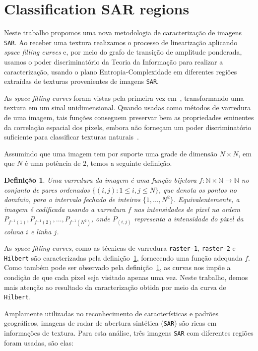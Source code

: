 \documentclass[12pt]{article}
\begin{document}
\section{Classification SAR regions}\label{SAR}

Neste trabalho propomos uma nova metodologia de caracterização de imagens \texttt{SAR}. 
Ao receber uma textura realizamos o processo de linearização aplicando \textit{space filling curves} e, por meio do grafo de transição de amplitude ponderada, usamos o poder discriminatório da Teoria da Informação para realizar a caracterização, usando o plano Entropia-Complexidade em diferentes regiões extraídas de texturas provenientes de imagens \texttt{SAR}.

As \textit{space filling curves} foram vistas pela primeira vez em~\cite{Nguyen1982SpaceFC}, transformando uma textura em um sinal unidimensional.
Quando usadas como métodos de varredura de uma imagem, tais funções conseguem preservar bem as propriedades eminentes da correlação espacial dos pixels, embora não forneçam um poder discriminatório suficiente para classificar texturas naturais~\citep{Lee1994Texture}. 

Assumindo que uma imagem tem por suporte uma grade de dimensão $N \times N$, em que $N$ é uma potência de $2$, temos a seguinte definição. 

\newtheorem{mydef}{Definição}
\begin{mydef}
    Uma varredura da imagem é uma função bijetora $f\colon \mathbb{N} \times \mathbb{N} \to \mathbb{N}$ no conjunto de pares ordenados $\{(i,j) : 1\leq i,j \leq N\}$, que denota os pontos no domínio, para o intervalo fechado de inteiros $\{1, \dots, N^2\}$. Equivalentemente, a imagem é codificada usando a varredura $f$ nas intensidades de pixel na ordem $P_{f^{-1}(1)}, P_{f^{-1}(2)}, \dots, P_{f^{-1}(N^2)}$, onde $P_{(i,j)}$ representa a intensidade do pixel da coluna $i$ e linha $j$.
    \label{def:CurveFilling}
\end{mydef}

As \textit{space filling curves}, como as técnicas de varredura \texttt{raster-1}, \texttt{raster-2} e \texttt{Hilbert} são caracterizadas pela definição~\ref{def:CurveFilling}, fornecendo uma função adequada $f$. 
Como também pode ser observado pela definição~\ref{def:CurveFilling}, as curvas nos impõe a condição de que cada pixel seja visitado apenas uma vez.
Neste trabalho, demos mais atenção ao resultado da caracterização obtida por meio da curva de \texttt{Hilbert}. 


Amplamente utilizadas no reconhecimento de características e padrões geográficos, imagens de radar de abertura sintética (\texttt{SAR}) são ricas em informações de textura. Para esta análise, três imagens \texttt{SAR} com diferentes regiões foram usadas, são elas:
\end{document}
